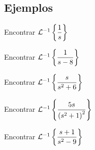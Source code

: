 \subsection{Ejemplos}


 \begin{problema}
  \label{bron:exmp:22.1}
  Encontrar $\mathcal{L}^{-1}\left\{ \dfrac{1}{s} \right\}$
 \end{problema}



 \begin{problema}
  \label{bron:exmp:22.2}
  Encontrar $\mathcal{L}^{-1}\left\{ \dfrac{1}{s-8} \right\}$
 \end{problema}




 \begin{problema}
  \label{bron:exmp:22.3}
  Encontrar $\mathcal{L}^{-1}\left\{ \dfrac{s}{s^{2}+6} \right\}$
 \end{problema}




 \begin{problema}
  \label{bron:exmp:22.4}
  Encontrar $\mathcal{L}^{-1}\left\{ \dfrac{5s}{\left( s^{2}+1 \right)^{2}} \right\}$
 \end{problema}



%
%
%


 \begin{problema}
  \label{bron:exmp:22.6}
  Encontrar $\mathcal{L}^{-1}\left\{ \dfrac{s+1}{s^{2}-9} \right\}$
 \end{problema}



